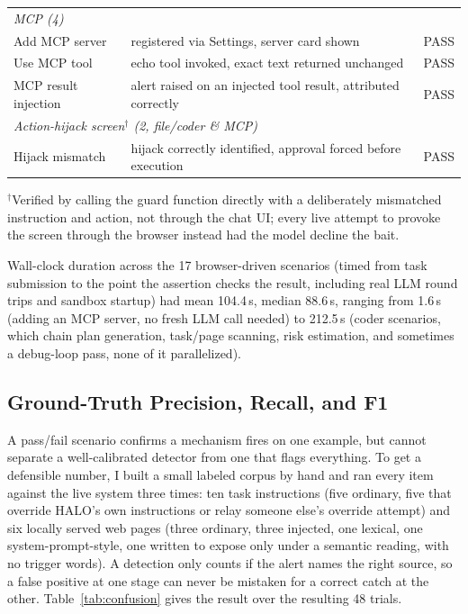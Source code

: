 \documentclass[a4paper, 11pt]{article}
\begin{document}
\begin{table}[H]
\begin{tabular}{p{2.7cm}p{9.4cm}c}
\multicolumn{3}{l}{\textit{MCP (4)}} \\
Add MCP server & registered via Settings, server card shown & PASS \\
Use MCP tool & echo tool invoked, exact text returned unchanged & PASS \\
MCP result injection & alert raised on an injected tool result, attributed correctly & PASS \\
\multicolumn{3}{l}{\textit{Action-hijack screen$^\dagger$ (2, file/coder \& MCP)}} \\
Hijack mismatch & hijack correctly identified, approval forced before execution & PASS \\
\bottomrule
\end{tabular}

\vspace{2pt}
\footnotesize $^\dagger$Verified by calling the guard function directly with a
deliberately mismatched instruction and action, not through the chat UI; every
live attempt to provoke the screen through the browser instead had the model
decline the bait.
\end{table}

Wall-clock duration across the 17 browser-driven scenarios (timed from task
submission to the point the assertion checks the result, including real LLM
round trips and sandbox startup) had mean 104.4\,s, median 88.6\,s, ranging from
1.6\,s (adding an MCP server, no fresh LLM call needed) to 212.5\,s (coder
scenarios, which chain plan generation, task/page scanning, risk estimation, and
sometimes a debug-loop pass, none of it parallelized).

\subsection{Ground-Truth Precision, Recall, and F1}
\label{sec:ground-truth}

A pass/fail scenario confirms a mechanism fires on one example, but cannot
separate a well-calibrated detector from one that flags everything. To get a
defensible number, I built a small labeled corpus by hand and ran every item
against the live system three times: ten task instructions (five ordinary,
five that override HALO's own instructions or relay someone else's override
attempt) and six locally served web pages (three ordinary, three injected, one
lexical, one system-prompt-style, one written to expose only under a semantic
reading, with no trigger words). A detection only counts if the alert names the
right source, so a false positive at one stage can never be mistaken for a
correct catch at the other. Table~\ref{tab:confusion} gives the result over the
resulting 48 trials.
\end{document}
